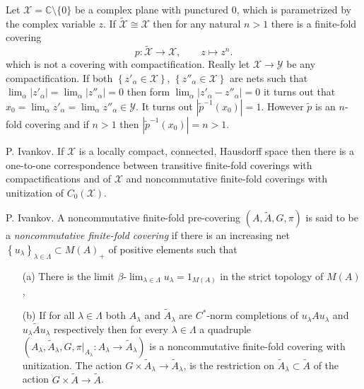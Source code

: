 \documentclass{beamer}
\theoremstyle{plain}
\newcommand{\C}{\mathbb{C}}
\newcommand{\al}{\alpha}
\begin{document}
\begin{frame}
\begin{example}
	
	Let $\mathcal X  = \C \setminus \{0\}$ be a complex plane with punctured 0, which is parametrized by the complex variable $z$. 
	If $\widetilde{   \mathcal X } \cong \mathcal X$ then for any natural $n>1$ there is a finite-fold covering 
	\begin{equation*}
	p: \widetilde{   \mathcal X } \to \mathcal X,
	\qquad	z \mapsto z^n.
	\end{equation*}
	which is not a covering with compactification. Really let  $\mathcal X \to\mathcal Y$ be any compactification. If both $\left\{z'_\al \in \mathcal X\right\}$, 	$\left\{z''_\al \in \mathcal X\right\}$ are  nets such that $\lim_{\al}\left|z'_\al\right|=\lim_\al\left|z''_\al\right| = 0$ then form $\lim_{\al}\left|z'_\al-z''_\al\right|= 0$ it turns out that
	$
	x_0 = \lim_{\al} z'_\al = \lim_{\al} z''_\al \in \mathcal Y
	$. 	It turns out $\left|\widetilde{p}^{-1}\left(x_0 \right) \right|=1$. However $\widetilde{p}$ is an $n$-fold covering and if $n >1$ then  $\left|\widetilde{p}^{-1}\left(x_0 \right) \right|=n>1$.
\end{example}
\end{frame}
\begin{frame}
\begin{lemma}
	\alert{P. Ivankov}. If $\mathcal X$ is a locally compact, connected, Hausdorff space then there is a one-to-one correspondence between transitive finite-fold coverings with compactifications and of $\mathcal X$ and noncommutative finite-fold coverings with unitization of $C_0\left(\mathcal X\right)$.
\end{lemma}
\begin{definition}
	\alert{P. Ivankov}.	A   noncommutative finite-fold  pre-covering $\left(A, \widetilde{A}, G, \pi \right)$ is said to be  a \textit{noncommutative finite-fold covering} if there is an increasing net $\left\{u_\lambda\right\}_{\lambda\in\Lambda}\subset M\left( A\right)_+ $  of positive elements such that
	\begin{enumerate}
		\item[(a)] There is the limit 
		$
		\beta\text{-}\lim_{\lambda \in \Lambda} u_\lambda = 1_{M\left(A \right) }
		$
		in the strict topology of $M\left(A \right)$,
		\item[(b)]  If for all   $\lambda\in\Lambda$ both $A_\lambda$ and  $\widetilde A_\lambda$ are $C^*$-norm completions  of $u_\lambda A u_\lambda$ and  $u_\lambda\widetilde{A}u_\lambda$ respectively then for every $\lambda\in\Lambda$ a quadruple
		$
		\left(A_\lambda, \widetilde{A}_\lambda, G, \left.\pi\right|_{A_\lambda} :A_\lambda\to \widetilde{A}_\lambda\right)	
		$
		is a noncommutative finite-fold covering with unitization. The action 	$G \times \widetilde{A}_\lambda\to \widetilde{A}_\lambda$, is the restriction on $\widetilde{A}_\lambda\subset \widetilde{   A}$ of the action $G\times  \widetilde{A}\to \widetilde{A}$.
	\end{enumerate}
	
\end{definition}
\end{frame}
\end{document}
